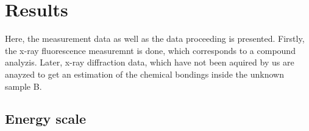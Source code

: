 


\section{Results}
\label{sec:Results}

Here, the measurement data as well as the data proceeding is presented. 
Firstly, the x-ray fluorescence measuremnt is done, which corresponds to a compound analyzis.
Later, x-ray diffraction data, which have not been aquired by us are anayzed to get an estimation of the chemical bondings inside the unknown sample B.
\subsection{Energy scale}
\label{sec:scaling}

